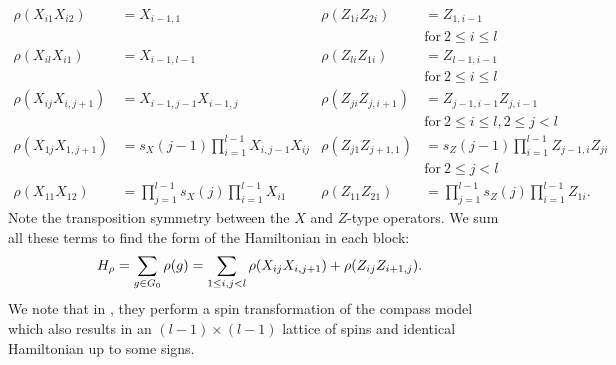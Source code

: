 \documentclass[12pt]{article}
\renewenvironment{framed}
{\begin{samepage}
\MakeFramed{\hsize0.8\linewidth\advance\hsize-\width\FrameRestore}}
{\endMakeFramed\end{samepage}}
\begin{document}
\begin{align*}
\rho(X_{i1} X_{i2}) &= X_{i-1,1} &
\rho(Z_{1i} Z_{2i}) &= Z_{1,i-1} \\&&&\mbox{for}\ 2\le i\le l\\
\rho(X_{il} X_{i1}) &= X_{i-1,l-1} &
\rho(Z_{li} Z_{1i}) &= Z_{l-1,i-1} \\&&&\mbox{for}\ 2\le i\le l\\
\rho(X_{ij} X_{i,j+1}) &= X_{i-1,j-1} X_{i-1,j} &
\rho(Z_{ji} Z_{j,i+1}) &= Z_{j-1,i-1}Z_{j,i-1} \\&&&\mbox{for}\ 2\le i\le l, 2\le j<l\\
\rho(X_{1j} X_{1,j+1}) &= s_X(j-1) \prod_{i=1}^{l-1} X_{i,j-1} X_{ij} &
\rho(Z_{j1} Z_{j+1,1}) &= s_Z(j-1) \prod_{i=1}^{l-1} Z_{j-1,i} Z_{ji} \\&&&\mbox{for}\ 2\le j<l\\
\rho(X_{11} X_{12}) &= \prod_{j=1}^{l-1}s_X(j) \prod_{i=1}^{l-1} X_{i1} &
\rho(Z_{11} Z_{21}) &= \prod_{j=1}^{l-1}s_Z(j) \prod_{i=1}^{l-1} Z_{1i}.
\end{align*}
Note the transposition symmetry between the $X$ and $Z$-type operators.
We sum all these terms to find 
the form of the Hamiltonian in each block:
$$
H_\rho = \sum_{g\in G_0} \rho(g) = \sum_{1\le i,j<l} \rho(X_{ij}X_{i,j+1}) + \rho(Z_{ij}Z_{i+1,j}).
$$
We note that in \cite{Brzezicki2013},
they perform a
spin transformation of the compass model
which also results in an $(l-1)\times(l-1)$ lattice
of spins and identical Hamiltonian up to some signs.


%
%
\end{document}
